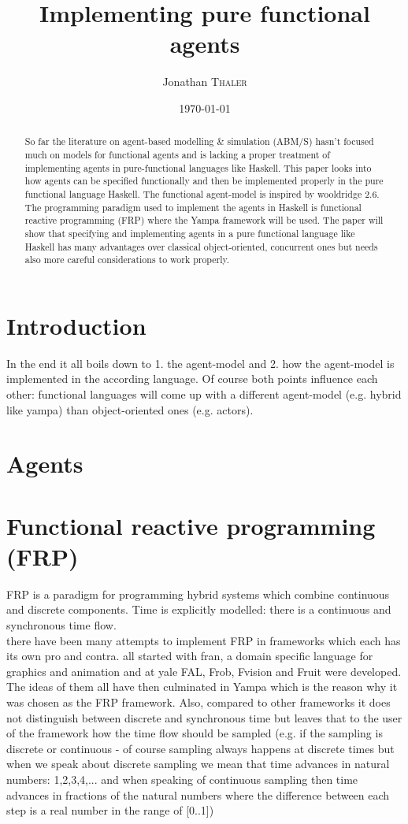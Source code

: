 \documentclass{article}
\title{Implementing pure functional agents} %
\author{Jonathan \textsc{Thaler}}
\date{\today}
\begin{document}
\maketitle 

\begin{abstract}
So far the literature on agent-based modelling \& simulation (ABM/S) hasn't focused much on models for functional agents and is lacking a proper treatment of implementing agents in pure-functional languages like Haskell. This paper looks into how agents can be specified functionally and then be implemented properly in the pure functional language Haskell. The functional agent-model is inspired by wooldridge 2.6. The programming paradigm used to implement the agents in Haskell is functional reactive programming (FRP) where the Yampa framework will be used. The paper will show that specifying and implementing agents in a pure functional language like Haskell has many advantages over classical object-oriented, concurrent ones but needs also more careful considerations to work properly.
\end{abstract}

\section{Introduction}
In the end it all boils down to 1. the agent-model and 2. how the agent-model is implemented in the according language. Of course both points influence each other: functional languages will come up with a different agent-model (e.g. hybrid like yampa) than object-oriented ones (e.g. actors).

\section{Agents}

\section{Functional reactive programming (FRP)}
FRP is a paradigm for programming hybrid systems which combine continuous and discrete components. Time is explicitly modelled: there is a continuous and synchronous time flow.  \\

there have been many attempts to implement FRP in frameworks which each has its own pro and contra. all started with fran, a domain specific language for graphics and animation and at yale FAL, Frob, Fvision and Fruit were developed. The ideas of them all have then culminated in Yampa which is the reason why it was chosen as the FRP framework. Also, compared to other frameworks it does not distinguish between discrete and synchronous time but leaves that to the user of the framework how the time flow should be sampled (e.g. if the sampling is discrete or continuous - of course sampling always happens at discrete times but when we speak about discrete sampling we mean that time advances in natural numbers: 1,2,3,4,... and when speaking of continuous sampling then time advances in fractions of the natural numbers where the difference between each step is a real number in the range of [0..1]) \\
\end{document}

